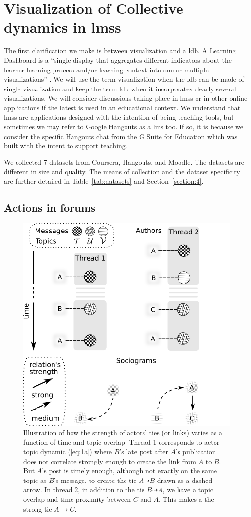 \documentclass[a4paper,twoside]{article}
\begin{document}
\section{Visualization of Collective dynamics in \glspl{lms}}
\label{section:2}

The first clarification we make is between visualization and a \gls{ldb}.  A Learning Dashboard is a ``single display that aggregates different indicators about the learner learning process and/or learning context into one or multiple visualizations'' \citep{Schwendimann2017}.  We will use the term visualization when the \gls{ldb} can be made of single visualization and keep the term \gls{ldb} when it incorporates clearly several visualizations.  
We will consider discussions taking place in \glspl{lms} or in other online applications if the latest is used in an educational context.  We understand that \glspl{lms} are applications designed with the intention of being teaching tools, but sometimes we may refer to Google Hangouts as a \gls{lms} too.   If so, it is because we consider the specific Hangouts chat from the G Suite for Education which was built with the intent to support teaching.

We collected 7 datasets from Coursera, Hangouts, and Moodle.  The datasets are different in size and quality.  The means of collection and the dataset specificity are further detailed in Table~\ref{tab:datasets} and Section~\ref{section:4}.  

\subsection{Actions in forums}

\begin{figure}[b]
 \small{
  \caption{\label{fig:discussion}
   Illustration of how the strength of actors' ties (or links) varies as a function of time and topic overlap.  Thread 1 corresponds to actor-topic dynamic (\ref{eq:1a}) where $B$'s late post after $A$'s  publication does not correlate strongly enough to create the link from $A$ to $B$.  But $A$'s  post is timely enough, although not exactly on the same topic as $B$'s message, to create the tie $A \dashrightarrow B$ drawn as a dashed arrow.  In thread 2, in addition to the tie $B \dashrightarrow A$, we have a topic overlap and time proximity between $C$ and $A$.  This makes a the strong tie $A \to C$.
  }}
 \centering
 \includegraphics[width=.45\textwidth]{images/discussion.png}
\end{figure}
\end{document}
